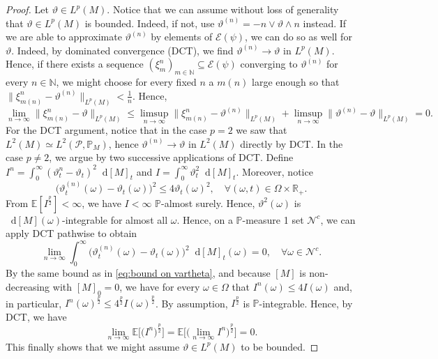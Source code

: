\documentclass[11pt,a4paper,twoside,openany]{report}
\numberwithin{equation}{section}
\newcommand{\diff}{\mathop{}\!\mathrm{d}}
\theoremstyle{plain} %
\theoremstyle{definition} %
\theoremstyle{remark} %
\begin{document}
\begin{proof}
Let \(\vartheta\in L^p(M)\). Notice that we can assume without loss of generality that \(\vartheta\in L^p(M)\) is bounded. Indeed, if not, use \(\vartheta^{(n)}=-n\vee \vartheta\wedge n\) instead. If we are able to approximate \(\vartheta^{(n)}\) by elements of \(\mathcal{E}(\psi)\), we can do so as well for \(\vartheta\). Indeed, by dominated convergence (DCT), we find \(\vartheta^{(n)}\to \vartheta\) in \(L^p(M)\). Hence, if there exists a sequence \((\xi^n_m)_{m\in\mathbb{N}}\subseteq \mathcal{E}(\psi)\) converging to \(\vartheta^{(n)}\) for every \(n\in\mathbb{N}\), we might choose for every fixed \(n\) a \(m(n)\) large enough so that \(\lVert \xi^n_{m(n)}-\vartheta^{(n)}\rVert_{L^p(M)}<\frac{1}{n}\). Hence, 
\begin{equation*}
    \lim_{n\to\infty}\big\lVert\xi^n_{m(n)}-\vartheta\big\rVert_{L^p(M)}\leq\limsup_{n\to\infty}\big\lVert\xi^n_{m(n)}-\vartheta^{(n)}\big\rVert_{L^p(M)}+\limsup_{n\to\infty}\big\lVert\vartheta^{(n)}-\vartheta\big\rVert_{L^p(M)}=0.
\end{equation*}
For the DCT argument, notice that in the case \(p=2\) we saw that \(L^2(M)\simeq L^2(\mathcal{P},\mathbb{P}_M)\), hence \(\vartheta^{(n)}\to\vartheta\) in \(L^2(M)\) directly by DCT. In the case \(p\neq 2\), we argue by two successive applications of DCT.
 Define \(I^n=\int_0^{\infty}(\vartheta^n_t-\vartheta_t)^2\diff[M]_t\) and \(I=\int_0^{\infty}\vartheta_t^2\diff[M]_t\). Moreover, notice
 \begin{equation}\label{eq:bound on vartheta}
     \Big(\vartheta_t^{(n)}(\omega)-\vartheta_t(\omega)\Big)^2\leq 4\vartheta_t(\omega)^2,\quad\forall(\omega,t)\in\Omega\times\mathbb{R}_+.
 \end{equation}
 From \(\mathbb{E}[I^{\frac{p}{2}}]<\infty\), we have \(I<\infty\) \(\mathbb{P}\)-almost surely. Hence, \(\vartheta^2(\omega)\) is \(\diff [M](\omega)\)-integrable for almost all \(\omega\). Hence, on a \(\mathbb{P}\)-measure 1 set \(\mathcal{N}^c\), we can apply DCT pathwise to obtain
 \begin{equation*}
     \lim_{n\to\infty}\int_0^{\infty}\Big(\vartheta^{(n)}_t(\omega)-\vartheta_t(\omega)\Big)^2\diff [M]_t(\omega)=0,\quad\forall\omega\in \mathcal{N}^c.
 \end{equation*}
 By the same bound as in \eqref{eq:bound on vartheta}, and because \([M]\) is non-decreasing with \([M]_0=0\), we have for every \(\omega\in\Omega\) that \(I^n(\omega)\leq 4 I(\omega)\) and, in particular, \(I^n(\omega)^{\frac{p}{2}}\leq 4^{\frac{p}{2}} I(\omega)^{\frac{p}{2}}\).  By assumption, \(I^{\frac{p}{2}}\) is \(\mathbb{P}\)-integrable. Hence, by DCT, we have 
 \begin{equation*}
  \lim_{n\to\infty}\mathbb{E}\Big[\big(I^n\big)^{\frac{p}{2}}\Big]=\mathbb{E}\Big[\big(\lim_{n\to\infty}I^n\big)^{\frac{p}{2}}\Big]=0.
 \end{equation*} 
 This finally shows that we might assume \(\vartheta\in L^p(M)\) to be bounded.




\end{proof}
\end{document}
